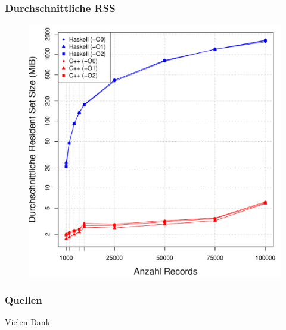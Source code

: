 \documentclass[presentation, shownotes]{beamer}
\begin{document}
\begin{frame}
\frametitle{Durchschnittliche RSS}
    \begin{figure}
    \centering
    \includegraphics[height=.8\textheight]{average_rss_desktop.pdf}
    \end{figure}
\end{frame}


\begin{frame}[allowframebreaks]
    \frametitle{Quellen}
    \printbibliography
\end{frame}

\begin{frame}
\centering
\Huge{Vielen Dank}
\end{frame}
\end{document}
